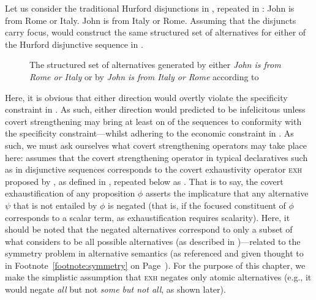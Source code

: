 Let us consider the traditional Hurford disjunctions in , repeated in :
\pex[nopreamble=true]\label{ex:hurford-repeat1}%
\a{}\ljudge{\#}John is from Rome or Italy.
\a{}\ljudge{\#}John is from Italy or Rome.
\xe
Assuming that the disjuncts carry focus, \textcite{Ippolito2020} would construct the same structured set of alternatives for either of the Hurford disjunctive sequence in .
\begin{figure}[!htb]
    \centering\hspace{-2cm}
    
    \caption{The structured set of alternatives generated by either \textit{John is from Rome or Italy} or by \textit{John is from Italy or Rome} according to \textcite{Ippolito2020}}
\end{figure}
Here, it is obvious that either direction would overtly violate the specificity constraint in . As such, either direction would predicted to be infelicitous unless covert strengthening may bring at least on of the sequences to conformity with the specificity constraint---whilst adhering to the economic constraint in . As such, we must ask ourselves what covert strengthening operators may take place here: \textcite{Ippolito2020} assumes that the covert strengthening operator in typical declaratives such as in disjunctive sequences corresponds to the covert exhaustivity operator {\scshape exh} proposed by \textcite{Chierchia2012}, as defined in , repeated below as .
\ex{}\xe
That is to say, the covert exhaustification of any proposition $\phi$ asserts the implicature that any alternative $\psi$ that is not entailed by $\phi$ is negated (that is, if the focused constituent of $\phi$ corresponds to a scalar term, as exhaustification requires scalarity). Here, it should be noted that the negated alternatives correspond to only a subset of what \textcite{Ippolito2020} considers to be all possible alternatives (as described in )---related to the symmetry problem in alternative semantics (as referenced and given thought to in Footnote~\ref{footnote:symmetry} on Page~\pageref{footnote:symmetry}). For the purpose of this chapter, we make the simplistic assumption that {\scshape exh} negates only atomic alternatives (e.g., it would negate \textit{all} but not \textit{some but not all}, as shown later).

